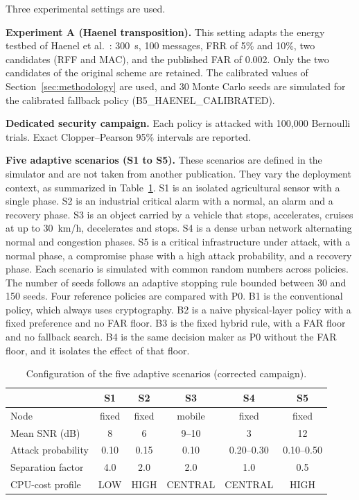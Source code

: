 \documentclass[conference]{IEEEtran}
\begin{document}
Three experimental settings are used.

\textbf{Experiment A (Haenel transposition).} This setting adapts the energy testbed of Haenel et al.~\cite{haenel2021practical}: 300~s, 100 messages, FRR of 5\% and 10\%, two candidates (RFF and MAC), and the published FAR of 0.002. Only the two candidates of the original scheme are retained. The calibrated values of Section~\ref{sec:methodology} are used, and 30 Monte Carlo seeds are simulated for the calibrated fallback policy (B5\_HAENEL\_CALIBRATED).

\textbf{Dedicated security campaign.} Each policy is attacked with 100{,}000 Bernoulli trials. Exact Clopper--Pearson 95\% intervals are reported.

\textbf{Five adaptive scenarios (S1 to S5).} These scenarios are defined in the simulator and are not taken from another publication. They vary the deployment context, as summarized in Table~\ref{tab:scenarios}. S1 is an isolated agricultural sensor with a single phase. S2 is an industrial critical alarm with a normal, an alarm and a recovery phase. S3 is an object carried by a vehicle that stops, accelerates, cruises at up to 30~km/h, decelerates and stops. S4 is a dense urban network alternating normal and congestion phases. S5 is a critical infrastructure under attack, with a normal phase, a compromise phase with a high attack probability, and a recovery phase. Each scenario is simulated with common random numbers across policies. The number of seeds follows an adaptive stopping rule bounded between 30 and 150 seeds. Four reference policies are compared with P0. B1 is the conventional policy, which always uses cryptography. B2 is a naive physical-layer policy with a fixed preference and no FAR floor. B3 is the fixed hybrid rule, with a FAR floor and no fallback search. B4 is the same decision maker as P0 without the FAR floor, and it isolates the effect of that floor.

\begin{table}[t]
\centering
\caption{Configuration of the five adaptive scenarios (corrected campaign).}
\label{tab:scenarios}
\begin{tabular}{lccccc}
\toprule
 & S1 & S2 & S3 & S4 & S5 \\
\midrule
Node & fixed & fixed & mobile & fixed & fixed \\
Mean SNR (dB) & 8 & 6 & 9--10 & 3 & 12 \\
Attack probability & 0.10 & 0.15 & 0.10 & 0.20--0.30 & 0.10--0.50 \\
Separation factor & 4.0 & 2.0 & 2.0 & 1.0 & 0.5 \\
CPU-cost profile & LOW & HIGH & CENTRAL & CENTRAL & HIGH \\
\bottomrule
\end{tabular}
\end{table}
\end{document}

